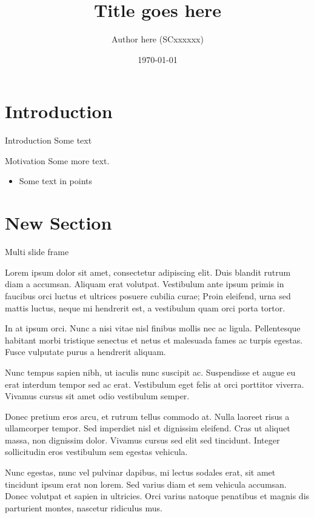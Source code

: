 \documentclass[10pt,xcolor=svgnames]{beamer} %
\title{Title goes here}
\author[Name]{Author here (SCxxxxxx)}
\institute[uni]{Course \\ Indian Institute of Space Science and Technology}
\date{\today} %
\begin{document}
\maketitle

\section{Introduction}
\begin{frame}{Introduction}
    Some text
\end{frame}

\begin{frame}{Motivation}
    Some more text. \begin{itemize}
        \item Some text in points
    \end{itemize}
\end{frame}


\section{New Section}

\begin{frame}[allowframebreaks]{Multi slide frame}
    

Lorem ipsum dolor sit amet, consectetur adipiscing elit. Duis blandit rutrum
diam a accumsan. Aliquam erat volutpat. Vestibulum ante ipsum primis in faucibus
orci luctus et ultrices posuere cubilia curae; Proin eleifend, urna sed mattis
luctus, neque mi hendrerit est, a vestibulum quam orci porta tortor.

In at ipsum orci. Nunc a nisi vitae nisl finibus mollis nec ac ligula.
Pellentesque habitant morbi tristique senectus et netus et malesuada fames ac
turpis egestas. Fusce vulputate purus a hendrerit aliquam.

Nunc tempus sapien nibh, ut iaculis nunc suscipit ac. Suspendisse et augue eu
erat interdum tempor sed ac erat. Vestibulum eget felis at orci porttitor
viverra. Vivamus cursus sit amet odio vestibulum semper.

\framebreak

Donec pretium eros arcu, et rutrum tellus commodo at. Nulla laoreet risus a
ullamcorper tempor. Sed imperdiet nisl et dignissim eleifend. Cras ut aliquet
massa, non dignissim dolor. Vivamus cursus sed elit sed tincidunt. Integer
sollicitudin eros vestibulum sem egestas vehicula. 

Nunc egestas, nunc vel pulvinar dapibus, mi lectus sodales erat, sit amet
tincidunt ipsum erat non lorem. Sed varius diam et sem vehicula accumsan. Donec
volutpat et sapien in ultricies. Orci varius natoque penatibus et magnis dis
parturient montes, nascetur ridiculus mus.
    
\end{frame}
\end{document}
